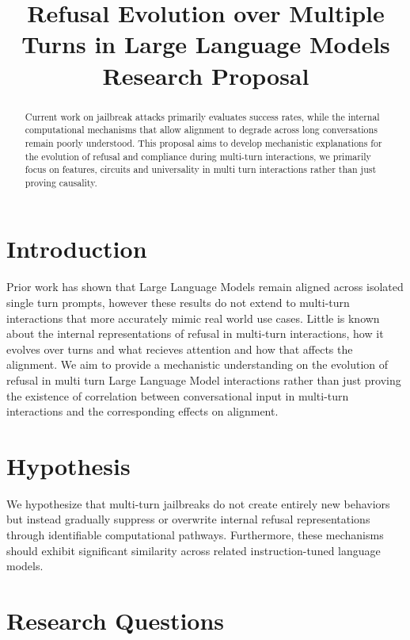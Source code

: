 \documentclass[11pt]{article}
\title{
Refusal Evolution over Multiple Turns in Large Language Models\\
\vspace{0.3cm}
\large Research Proposal
}
\author{}
\date{}
\begin{document}
\maketitle

\begin{abstract}

Current work on jailbreak attacks primarily evaluates success rates, while the 
internal computational mechanisms that allow alignment to degrade across long 
conversations remain poorly understood.
This proposal aims to develop mechanistic explanations for the evolution of 
refusal and compliance during multi-turn interactions, we primarily 
focus on features, circuits and universality in multi turn interactions
rather than just proving causality.

\end{abstract}

\section{Introduction}

Prior work has shown that Large Language Models remain aligned across isolated 
single turn prompts, however these results do not extend to multi-turn 
interactions that more accurately mimic real world use cases.
Little is known about the internal representations of refusal in multi-turn
interactions, how it evolves over turns and what recieves attention and how that
affects the alignment. 
We aim to provide a mechanistic understanding on the evolution of refusal
in multi turn Large Language Model interactions rather than just proving 
the existence of correlation between conversational input in multi-turn interactions
and the corresponding effects on alignment. 

\section{Hypothesis}

We hypothesize that multi-turn jailbreaks do not create entirely new 
behaviors but instead gradually suppress or overwrite internal refusal 
representations through identifiable computational pathways.
Furthermore, these mechanisms should exhibit significant similarity across 
related instruction-tuned language models.

\section{Research Questions}
\end{document}
